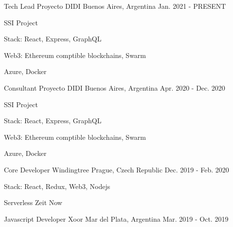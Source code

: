 


\begin{cventries}

\cventry
{Tech Lead} %
{Proyecto DIDI} %
{Buenos Aires, Argentina} %
{Jan. 2021 - PRESENT} %
{ %
\begin{cvitems}
\item {SSI Project}
\item {Stack: React, Express, GraphQL}
\item {Web3: Ethereum comptible blockchains, Swarm}
\item {Azure, Docker}
\end{cvitems}
}
\cventry
{Consultant} %
{Proyecto DIDI} %
{Buenos Aires, Argentina} %
{Apr. 2020 - Dec. 2020} %
{ %
\begin{cvitems}
\item {SSI Project}
\item {Stack: React, Express, GraphQL}
\item {Web3: Ethereum comptible blockchains, Swarm}
\item {Azure, Docker}
\end{cvitems}
}
\cventry
{Core Developer} %
{Windingtree} %
{Prague, Czech Republic} %
{Dec. 2019 - Feb. 2020} %
{ %
\begin{cvitems}
\item {Stack: React, Redux, Web3, Nodejs}
\item {Serverless Zeit Now}
\end{cvitems}
}
\cventry
{Javascript Developer} %
{Xoor} %
{Mar del Plata, Argentina} %
{Mar. 2019 - Oct. 2019} %
{ %
}
\end{cventries}
